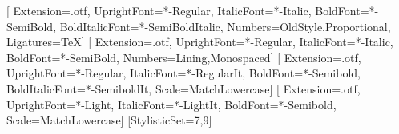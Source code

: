 \usepackage[letterpaper,top=1in,bottom=1in,left=1.1in,right=1.1in,
            headheight=16pt,headsep=22pt,footskip=30pt]{geometry}

\usepackage{fontspec}
\usepackage{unicode-math}
\setmainfont{EBGaramond}[
  Extension=.otf, UprightFont=*-Regular, ItalicFont=*-Italic,
  BoldFont=*-SemiBold, BoldItalicFont=*-SemiBoldItalic,
  Numbers={OldStyle,Proportional}, Ligatures=TeX]
\newfontfamily{}[
  Extension=.otf, UprightFont=*-Regular, ItalicFont=*-Italic,
  BoldFont=*-SemiBold, Numbers={Lining,Monospaced}]
\setsansfont{SourceSansPro}[
  Extension=.otf, UprightFont=*-Regular, ItalicFont=*-RegularIt,
  BoldFont=*-Semibold, BoldItalicFont=*-SemiboldIt,
  Scale=MatchLowercase]
\newfontfamily{}[
  Extension=.otf, UprightFont=*-Light, ItalicFont=*-LightIt,
  BoldFont=*-Semibold, Scale=MatchLowercase]
[StylisticSet={7,9}]

\usepackage[babel=true]{microtype}
\usepackage[english]{babel}
\usepackage{csquotes}
\linespread{1.12}
\setlength{\parindent}{1.2em}
\setlength{\parskip}{0pt}
\color{ink}

\usepackage{graphicx}
\usepackage{booktabs}
\usepackage{tabularx}
\usepackage{array}
\usepackage{multirow}
\usepackage{makecell}
\usepackage{enumitem}
\usepackage{siunitx}
\usepackage{xcolor}
\usepackage{caption}
\usepackage{subcaption}
\usepackage{float}
\usepackage{etoolbox}
\usepackage{xparse}

